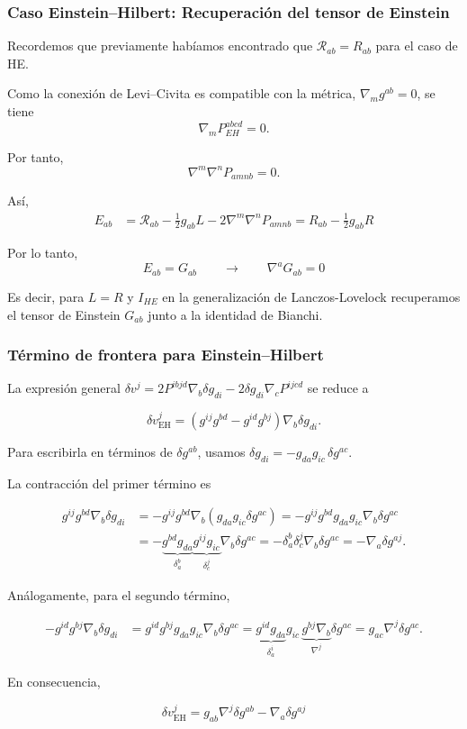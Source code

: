 \documentclass{beamer}
\begin{document}
\begin{frame}[label=nav-frame-037]
\frametitle{Caso Einstein--Hilbert: Recuperación del tensor de Einstein}

Recordemos que previamente habíamos encontrado que $\mathcal R_{ab}=R_{ab}$ para el caso de HE.

Como la conexión de Levi--Civita es compatible con la métrica, $\nabla_m g^{ab}=0$, se tiene
\[
\nabla_m P^{abcd}_{EH}=0.
\]

Por tanto,
\[
\nabla^m\nabla^nP_{amnb}=0.
\]

Así,
\[
\begin{aligned}
E_{ab}&=\mathcal R_{ab}-\frac12 g_{ab}L-2\nabla^m\nabla^nP_{amnb}
=R_{ab}-\frac12 g_{ab}R
\end{aligned}
\]

Por lo tanto,
\[
\boxed{
E_{ab}=G_{ab}
}
\qquad
\longrightarrow
\qquad
\nabla^a G_{ab} = 0
\]

Es decir, para $L=R$  y $I_{HE}$ en la generalización de Lanczos-Lovelock recuperamos el tensor de Einstein $G_{ab}$ junto a la identidad de Bianchi.
\end{frame}

\begin{frame}[label=nav-frame-038]
\frametitle{Término de frontera para Einstein--Hilbert}
\footnotesize

La expresión general $\delta v^j = 2P^{ibjd}\nabla_b\delta g_{di} - 2\delta g_{di}\nabla_cP^{ijcd}$ se reduce a

\[
\delta v_{\mathrm{EH}}^{j}
=
\left(
g^{ij}g^{bd}-g^{id}g^{bj}
\right)
\nabla_b\delta g_{di}.
\]

Para escribirla en términos de \(\delta g^{ab}\), usamos $\delta g_{di} = -g_{da}g_{ic}\,\delta g^{ac}$.

La contracción del primer término es

\begin{align*}
g^{ij}g^{bd}\nabla_b\delta g_{di}
&=
-g^{ij}g^{bd}
\nabla_b
\left(
g_{da}g_{ic}\delta g^{ac}
\right)
=
-g^{ij}g^{bd}g_{da}g_{ic}
\nabla_b\delta g^{ac}
\\
&=
-\underbrace{g^{bd}g_{da}}_{\delta^b_a}
 \underbrace{g^{ij}g_{ic}}_{\delta^j_c}
\nabla_b\delta g^{ac}
=
-\delta^b_a\delta^j_c
\nabla_b\delta g^{ac}
=
-\nabla_a\delta g^{aj}.
\end{align*}

Análogamente, para el segundo término,

\begin{align*}
-g^{id}g^{bj}\nabla_b\delta g_{di}
&=
g^{id}g^{bj}g_{da}g_{ic}
\nabla_b\delta g^{ac}
=
\underbrace{g^{id}g_{da}}_{\delta^i_a}
g_{ic}\,
\underbrace{g^{bj}\nabla_b}_{\nabla^j}
\delta g^{ac}
=
g_{ac}\nabla^j\delta g^{ac}.
\end{align*}

En consecuencia,

\[
\boxed{
\delta v_{\mathrm{EH}}^{j}
=
g_{ab}\nabla^j\delta g^{ab}
-
\nabla_a\delta g^{aj}
}
\]

\end{frame}
\end{document}
